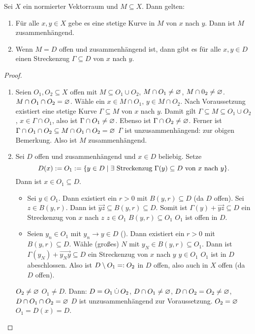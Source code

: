 \documentclass[a4paper,twoside,DIV15,BCOR12mm]{scrbook}
\begin{document}
\begin{satz} \label{satz2.8}
  Sei $X$ ein normierter Vektorraum und $M\subseteq X$. Dann gelten:
  \begin{enumerate}
  \item \label{satz2.8a} Für alle $x,y\in X$ gebe es eine stetige Kurve in $M$ von $x$ nach $y$. Dann ist $M$ zusammenhängend.
  \item \label{satz2.8b} Wenn $M=D$ offen und zusammenhängend ist, dann gibt es für alle $x,y\in D$ einen Streckenzug
    $\Gamma\subseteq D$ von $x$ nach $y$.
  \end{enumerate}
\end{satz}
\begin{proof}
  \begin{enumerate}
  \item Seien $O_1,O_2\subseteq X$ offen mit $M\subseteq O_1\cup O_2$, $M\cap O_1\neq\varnothing$, $M\cap 0_2\neq\varnothing$. \ann $M\cap O_1\cap
    O_2=\varnothing$. Wähle ein $x\in M\cap O_1$, $y\in M\cap O_2$. Nach Voraussetzung existiert eine stetige Kurve $\Gamma\subseteq
    M$ von $x$ nach $y$. Damit gilt $\Gamma\subseteq M\subseteq O_1\cup O_2$, $x\in\Gamma\cap O_1$, also ist $\Gamma\cap
    O_1\neq\varnothing$. Ebenso ist $\Gamma\cap O_2\neq\varnothing$. Ferner ist $\Gamma\cap O_1\cap O_2\subseteq M\cap O_1\cap O_2=\varnothing$
    \folgt $\Gamma$ ist unzusammenhängend: \ws zur obigen Bemerkung. Also ist $M$ zusammenhängend.
  \item Sei $D$ offen und zusammenhängend und $x\in D$ beliebig. Setze
    \[ D(x) := O_1 := \{ y\in D \mid \exists \text{ Streckenzug } \Gamma(y)\subseteq D \text{ von } x \text{ nach } y \}. \]
    Dann ist $x\in O_1\subseteq D$.
    \begin{itemize}
    \item Sei $y\in O_1$. Dann existiert ein $r>0$ mit $B(y,r)\subseteq D$ (da $D$ offen). Sei $z\in B(y,r)$. Dann ist
      $\overrightarrow{yz}\subseteq B(y,r)\subseteq D$. Somit ist $\Gamma(y)+\overrightarrow{yz}\subseteq D$ ein Streckenzug von
      $x$ nach $z$ \folgt $z\in O_1$ \folgt $B(y,r)\subseteq O_1$ \folgt $O_1$ ist offen in $D$.
    \item Seien $y_n\in O_1$ mit $y_n\to y\in D$ (\ninf). Dann existiert ein $r>0$ mit $B(y,r)\subseteq D$. Wähle (großes) $N$
      mit $y_N\in B(y,r)\subseteq O_1$. Dann ist $\Gamma(y_N) + \overrightarrow{y_Ny}\subseteq D$ ein Streckenzug von $x$ nach
      $y$ \folgt $y\in O_1$ \folgt $O_1$ ist in $D$ abeschlossen. Also ist $D\setminus O_1=: O_2$ in $D$ offen, also auch in
      $X$ offen (da $D$ offen).
    \end{itemize}
    \ann $O_2\neq\varnothing$ \gdw $O_1\neq D$. Dann: $D=O_1\mathbin{\dot{\cup}} O_2$, $D\cap O_1\neq\varnothing$, $D\cap O_2=O_2\neq\varnothing$, $D\cap
    O_1\cap O_2=\varnothing$ \folgt $D$ ist unzusammenhängend \ws zur Voraussetzung. \folgt $O_2=\varnothing$ \folgt $O_1=D(x)=D$. \qedhere
  \end{enumerate}
\end{proof}
\end{document}
